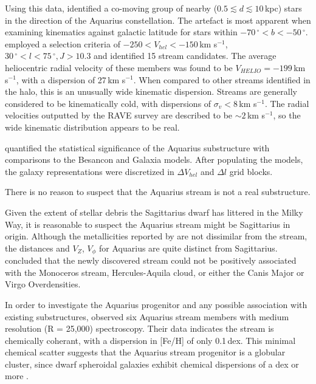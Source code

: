 \documentclass{emulateapj}
\begin{document}
Using this data, \citet{williams;et-al_2011} identified a co-moving group of nearby ($0.5 \lesssim d \lesssim 10$\,kpc) stars in the direction of the Aquarius constellation. The artefact is most apparent when examining kinematics against galactic latitude for stars within $-70\,^\circ < b < -50\,^\circ$. \citet{williams;et-al_2011} employed a selection criteria of $-250 < V_{hel} < -150$\,km s$^{-1}$, $30\,^\circ < l < 75\,^\circ, J > 10.3$ and identified 15 stream candidates. The average heliocentric radial velocity of these members was found to be $V_{HELIO} = -199$\,km s$^{-1}$, with a dispersion of 27\,km s$^{-1}$. When compared to other streams identified in the halo, this is an unusually wide kinematic dispersion. Streams are generally considered to be kinematically cold, with dispersions of $\sigma_v < 8$\,km s$^{-1}$. The radial velocities outputted by the RAVE survey are described to be $\sim2$\,km s$^{-1}$, so the wide kinematic distribution appears to be real.

\citet{williams;et-al_2011} quantified the statistical significance of the Aquarius substructure with comparisons to the Besancon and Galaxia models. After populating the models, the galaxy representations were discretized in $\Delta{}V_{hel}$ and $\Delta{}l$ grid blocks. 

There is no reason to suspect that the Aquarius stream is not a real substructure.

Given the extent of stellar debris the Sagittarius dwarf has littered in the Milky Way, it is reasonable to suspect the Aquarius stream might be Sagittarius in origin. Although the metallicities reported by \citet{williams;et-al_2011} are not dissimilar from the stream, the distances and $V_{Z}$, $V_\phi$ for Aquarius are quite distinct from Sagittarius. \citet{williams;et-al_2011} concluded that the newly discovered stream could not be positively associated with the Monoceros stream, Hercules-Aquila cloud, or either the Canis Major or Virgo Overdensities.

In order to investigate the Aquarius progenitor and any possible association with existing substructures, \citet{wylie-de-boer;et-al_2012} observed six Aquarius stream members with medium resolution (R = 25,000) spectroscopy. Their data indicates the stream is chemically coherant, with a dispersion in [Fe/H] of only 0.1\,dex. This minimal chemical scatter suggests that the Aquarius stream progenitor is a globular cluster, since dwarf spheroidal galaxies  exhibit chemical dispersions of a dex or more \citet{Frebel_Norris_2011}. 
\end{document}
